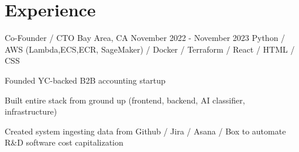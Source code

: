 \documentclass[letterpaper]{simjega-resume}
\begin{document}






%
%

\section{Experience}
\jgsectionline

{Co-Founder / CTO}
{Bay Area, CA}
{November 2022 - November 2023}
{Python / AWS (Lambda,ECS,ECR, SageMaker) / Docker / Terraform / React / HTML / CSS}
{\begin{tightitemize}
\item[] Founded YC-backed B2B accounting startup
\item[] Built entire stack from ground up (frontend, backend, AI classifier, infrastructure)
\item[] Created system ingesting data from Github / Jira / Asana / Box to automate R\&D software cost capitalization
\end{tightitemize}}
\end{document}
